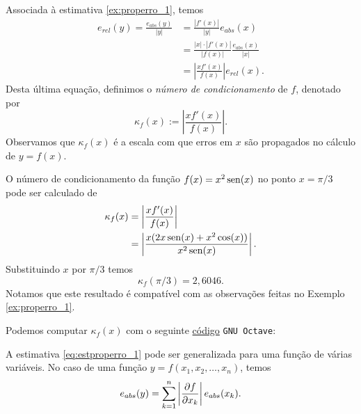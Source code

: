 Associada à estimativa \eqref{ex:properro_1}, temos
\begin{align*}
  e_{rel}(y) = \frac{e_{abs}(y)}{|y|} &= \frac{|f'(x)|}{|y|}e_{abs}(x)\\
  &= \frac{|x|\cdot |f'(x)|}{|f(x)|}\frac{e_{abs}(x)}{|x|}\\
  &= \left|\frac{xf'(x)}{f(x)}\right|e_{rel}(x).
\end{align*}
Desta última equação, definimos o \emph{número de condicionamento} de $f$, denotado por
\begin{equation}
  \kappa_f(x) := \left|\frac{xf'(x)}{f(x)}\right|.
\end{equation}
Observamos que $\kappa_f(x)$ é a escala com que erros em $x$ são propagados no cálculo de $y = f(x)$.

\begin{ex}\label{ex:numcond_1}
  O número de condicionamento da função $f(x) = x^2\operatorname{sen}(x)$ no ponto $x=\pi/3$ pode ser calculado de
  \begin{align}
    \kappa_f(x) &= \left|\frac{xf'(x)}{f(x)}\right|\\
                &= \left|\frac{x(2x\operatorname{sen}(x)+x^2\cos(x))}{x^2\operatorname{sen}(x)}\right|. 
  \end{align}
  Substituindo $x$ por $\pi/3$ temos
  \begin{equation}
    \kappa_f(\pi/3) = 2,6046.
  \end{equation}
  Notamos que este resultado é compatível com as observações feitas no Exemplo \ref{ex:properro_1}.
  
  \ifisoctave
  Podemos computar $\kappa_f(x)$ com o seguinte \href{https://github.com/phkonzen/notas/blob/master/src/MatematicaNumerica/cap_aritm/dados/ex_numcond_1/ex_numcond_1.m}{código} \verb+GNU Octave+:
  
  \fi
\end{ex}

A estimativa \eqref{eq:estproperro_1} pode ser generalizada para uma função de várias variáveis. No caso de uma função $y = f(x_1,x_2,\dotsc,x_n)$, temos
\begin{equation}\label{eq:estproperro_n}
  e_{abs}(y) = \sum_{k=1}^n \left|\frac{\partial f}{\partial x_k}\right|e_{abs}(x_k).
\end{equation}

